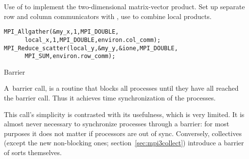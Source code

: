 Use of  to implement the two-dimensional
matrix-vector product.
Set up separate row and column communicators with
, use  to combine
local products.
%
\begin{lstlisting}
MPI_Allgather(&my_x,1,MPI_DOUBLE,
   	  local_x,1,MPI_DOUBLE,environ.col_comm);
MPI_Reduce_scatter(local_y,&my_y,&ione,MPI_DOUBLE,
	  MPI_SUM,environ.row_comm);
\end{lstlisting}

 {Barrier}
\label{sec:barrier}

A~barrier call,
%
%
is a
routine that blocks all processes until they have all reached the barrier
call. Thus it achieves time synchronization of the processes.

This call's simplicity is contrasted with its usefulness, which
is very limited. It is almost never necessary to synchronize processes
through a barrier: for most purposes it does not matter if processors
are out of sync. Conversely, collectives (except the new non-blocking
ones; section~\ref{sec:mpi3collect}) introduce a barrier of sorts themselves.


